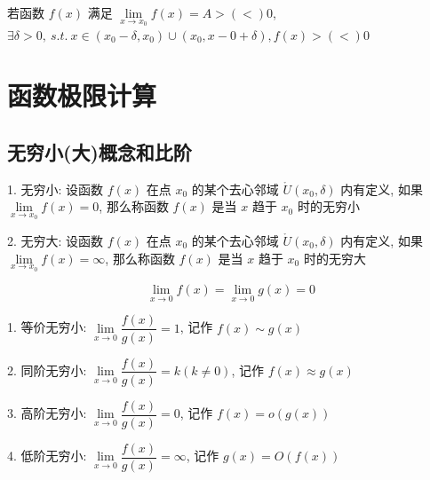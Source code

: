 \begin{property}[局部保号性]
	若函数 $f(x)$ 满足 $\lim\limits_{x\to x_{0}}f(x)=A>(<)0$, $\exists \delta > 0,\ s.t.\ x\in(x_{0}-\delta,x_{0})\cup(x_{0},x-{0}+\delta), f(x) > (<) 0$
\end{property}

\section{函数极限计算}
\subsection{无穷小(大)概念和比阶}
\begin{definition}[无穷小(大)]
	1. 无穷小: 设函数 $f(x)$ 在点 $x_{0}$ 的某个去心邻域 $\mathring{U}(x_{0},\delta)$ 内有定义, 如果 $\lim\limits_{x\to x_{0}}f(x)=0$, 那么称函数 $f(x)$ 是当 $x$ 趋于 $x_{0}$ 时的无穷小

	2. 无穷大: 设函数 $f(x)$ 在点 $x_{0}$ 的某个去心邻域 $\mathring{U}(x_{0},\delta)$ 内有定义, 如果 $\lim\limits_{x\to x_{0}}f(x)=\infty$, 那么称函数 $f(x)$ 是当 $x$ 趋于 $x_{0}$ 时的无穷大
\end{definition}

\begin{definition}[无穷小比阶]
	$$\lim\limits_{x\to 0}f(x)=\lim\limits_{x\to 0}g(x)=0$$

	1. 等价无穷小: $\lim\limits_{x\to 0}\dfrac{f(x)}{g(x)}=1$, 记作 $f(x)\sim g(x)$

	2. 同阶无穷小: $\lim\limits_{x\to 0}\dfrac{f(x)}{g(x)}=k(k\neq 0)$, 记作 $f(x)\approx g(x)$

	3. 高阶无穷小: $\lim\limits_{x\to 0}\dfrac{f(x)}{g(x)}=0$, 记作 $f(x)=o(g(x))$

	4. 低阶无穷小: $\lim\limits_{x\to 0}\dfrac{f(x)}{g(x)}=\infty$, 记作 $g(x)=O(f(x))$
\end{definition}

